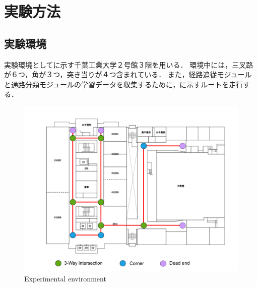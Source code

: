 \newpage
\section{実験方法}
\subsection{実験環境}
実験環境としてに示す千葉工業大学２号館３階を用いる．
環境中には，三叉路が６つ，角が３つ，突き当りが４つ含まれている．
また，経路追従モジュールと通路分類モジュールの学習データを収集するために，に示すルートを走行する．

\begin{figure}[htbp]
  \centering
  \includegraphics[width=130mm]{images/pdf/ishiguro/topo.pdf}
  \caption{Experimental environment}
  \label{fig:topo}
\end{figure}

